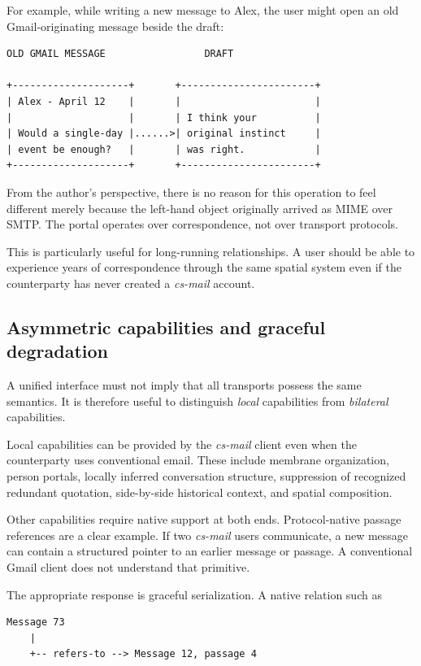 \documentclass[11pt]{article}
\newcommand{\csmail}{\textit{cs-mail}}
\begin{document}
For example, while writing a new message to Alex, the user might open an old Gmail-originating message beside the draft:

\begin{Verbatim}[fontsize=\small]
OLD GMAIL MESSAGE                 DRAFT

+--------------------+       +-----------------------+
| Alex - April 12    |       |                       |
|                    |       | I think your          |
| Would a single-day |......>| original instinct     |
| event be enough?   |       | was right.            |
+--------------------+       +-----------------------+
\end{Verbatim}

From the author's perspective, there is no reason for this operation to feel different merely because the left-hand object originally arrived as MIME over SMTP. The portal operates over correspondence, not over transport protocols.

This is particularly useful for long-running relationships. A user should be able to experience years of correspondence through the same spatial system even if the counterparty has never created a \csmail{} account.

\subsection*{Asymmetric capabilities and graceful degradation}

A unified interface must not imply that all transports possess the same semantics. It is therefore useful to distinguish \emph{local} capabilities from \emph{bilateral} capabilities.

Local capabilities can be provided by the \csmail{} client even when the counterparty uses conventional email. These include membrane organization, person portals, locally inferred conversation structure, suppression of recognized redundant quotation, side-by-side historical context, and spatial composition.

Other capabilities require native support at both ends. Protocol-native passage references are a clear example. If two \csmail{} users communicate, a new message can contain a structured pointer to an earlier message or passage. A conventional Gmail client does not understand that primitive.

The appropriate response is graceful serialization. A native relation such as

\begin{Verbatim}[fontsize=\small]
Message 73
    |
    +-- refers-to --> Message 12, passage 4
\end{Verbatim}
\end{document}
